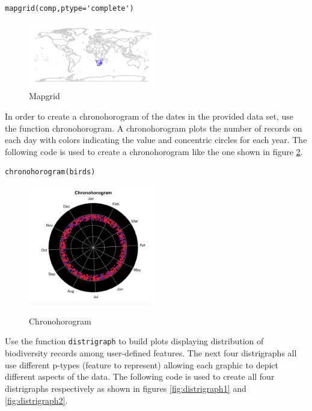\begin{lstlisting}
mapgrid(comp,ptype='complete')
\end{lstlisting}

\begin{figure}[htbp!]
   \centering
   \includegraphics[width=0.5\textwidth]{pictures/biodiversity/map.jpg} 
      \caption{Mapgrid}
   \label{fig:Mapgrid}
\end{figure} 

In order to create a chronohorogram of the dates in the provided data set, use the function chronohorogram.
A chronohorogram plots the number of records on each day with colors indicating the value and concentric circles for each year.
The following code is used to create a chronohorogram like the one shown in figure \ref{fig:chronohorogram}.

\begin{lstlisting}
chronohorogram(birds)
\end{lstlisting}

\begin{figure}[htbp!] 
   \centering
      \caption{Chronohorogram}
   \includegraphics[width=0.5\textwidth]{pictures/biodiversity/chronohorogram.jpg} 
   \label{fig:chronohorogram}
\end{figure} 

Use the function \texttt{distrigraph} to build plots displaying distribution of biodiversity records among user-defined features.
The next four distrigraphs all use different p-types (feature to represent) allowing each graphic to depict different aspects of the data.
The following code is used to create all four distrigraphs respectively as shown in figures \ref{fig:distrigraph1} and \ref{fig:distrigraph2}.

